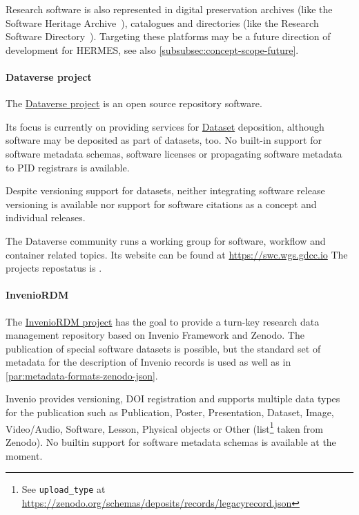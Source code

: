 \documentclass[11pt,a4paper]{scrartcl}
\begin{document}
Research software is also represented in digital preservation archives (like the Software Heritage Archive~\cite{SWHArchive}),
catalogues and directories (like the Research Software Directory~\cite{RSD-2018}). Targeting these platforms may be a 
future direction of development for HERMES, see also \ref{subsubsec:concept-scope-future}.

\paragraph{Dataverse project}\label{par:repos-dataverse}
The \href{https://dataverse.org}{Dataverse project} is an open source repository software.

Its focus is currently on providing services for \href{http://purl.org/dc/dcmitype/Dataset}{Dataset} deposition, although 
software may be deposited as part of datasets, too. No built-in support for software metadata schemas, software licenses
or propagating software metadata to PID registrars is available.

Despite versioning support for datasets, neither integrating software release versioning is available nor support for
software citations as a concept and individual releases.

The Dataverse community runs a working group for software, workflow and container related topics.
Its website can be found at \url{https://swc.wgs.gdcc.io} The projects \gls{repostatus} is .

\paragraph{InvenioRDM}\label{par:repos-inveniordm}
The \href{https://inveniosoftware.org/products/rdm/}{InvenioRDM project} has the goal to provide a turn-key research data
management repository based on Invenio Framework and Zenodo. The publication of special software datasets is possible,
but the standard set of metadata for the description of Invenio records is used as well as in \ref{par:metadata-formats-zenodo-json}.

Invenio provides versioning, DOI registration and supports multiple data types for the publication such as Publication, Poster,
Presentation, Dataset, Image, Video/Audio, Software, Lesson, Physical objects or Other 
(list\footnote{See \texttt{upload\_type} at \url{https://zenodo.org/schemas/deposits/records/legacyrecord.json}} taken from Zenodo).
No builtin support for software metadata schemas is available at the moment. 
\end{document}
